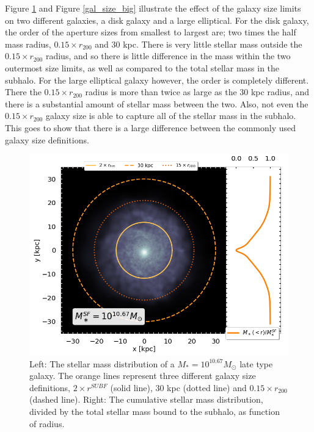 Figure \ref{gal_size_disk} and Figure \ref{gal_size_big} illustrate the effect of the galaxy size limits on two different galaxies, a disk galaxy and a large elliptical. For the disk galaxy, the order of the aperture sizes from smallest to largest are; two times the half mass radius, $0.15 \times r_{200}$ and 30 kpc. There is very little stellar mass outside the $0.15 \times r_{200}$ radius, and so there is little difference in the mass within the two outermost size limits, as well as compared to the total stellar mass in the subhalo. For the large elliptical galaxy however, the order is completely different. There the $0.15 \times r_{200}$ radius is more than twice as large as the 30 kpc radius, and there is a substantial amount of stellar mass between the two. Also, not even the $0.15 \times r_{200}$ galaxy size is able to capture all of the stellar mass in the subhalo. This goes to show that there is a large difference between the commonly used galaxy size definitions.


\begin{figure}
	\centering
    \includegraphics[width=1\textwidth]{images/galaxy_size_disk.png}
    \caption{Left: The stellar mass distribution of a $M_\ast = 10^{10.67} M_\odot$ late type galaxy. The orange lines represent three different galaxy size definitions, $2 \times r^{SUBF}$ (solid line), 30 kpc (dotted line) and $0.15 \times r_{200}$ (dashed line).
    Right: The cumulative stellar mass distribution, divided by the total stellar mass bound to the subhalo, as function of radius.
    }
    \label{gal_size_disk}
\end{figure}


